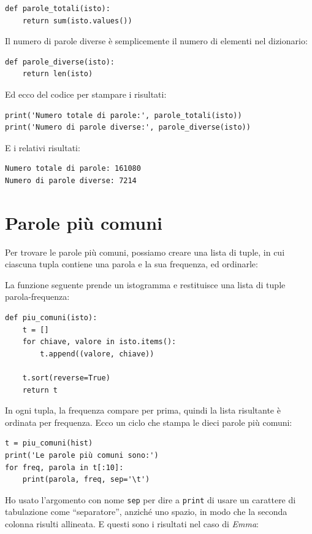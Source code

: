 \documentclass[10pt]{book}
\begin{document}
\begin{verbatim}
def parole_totali(isto):
    return sum(isto.values())
\end{verbatim}
%
Il numero di parole diverse è semplicemente il numero di elementi nel dizionario:

\begin{verbatim}
def parole_diverse(isto):
    return len(isto)
\end{verbatim}
%
Ed ecco del codice per stampare i risultati:

\begin{verbatim}
print('Numero totale di parole:', parole_totali(isto))
print('Numero di parole diverse:', parole_diverse(isto))
\end{verbatim}
%
E i relativi risultati:

\begin{verbatim}
Numero totale di parole: 161080
Numero di parole diverse: 7214
\end{verbatim}
%

\section{Parole più comuni}

Per trovare le parole più comuni, possiamo creare una lista di tuple, in cui ciascuna tupla contiene una parola e la sua frequenza, ed ordinarle:

La  funzione seguente prende un istogramma e restituisce una lista di tuple parola-frequenza:

\begin{verbatim}
def piu_comuni(isto):
    t = []
    for chiave, valore in isto.items():
        t.append((valore, chiave))

    t.sort(reverse=True)
    return t
\end{verbatim}
%
In ogni tupla, la frequenza compare per prima, quindi la lista risultante è ordinata per frequenza. Ecco un ciclo che stampa le dieci parole più comuni:

\begin{verbatim}
t = piu_comuni(hist)
print('Le parole più comuni sono:')
for freq, parola in t[:10]:
    print(parola, freq, sep='\t')
\end{verbatim}
%
Ho usato l'argomento con nome {\tt sep} per dire a {\tt print} di usare un carattere di tabulazione come ``separatore'', anziché uno spazio, in modo che la seconda colonna risulti allineata.
E questi sono i risultati nel caso di {\em Emma}:
\end{document}

